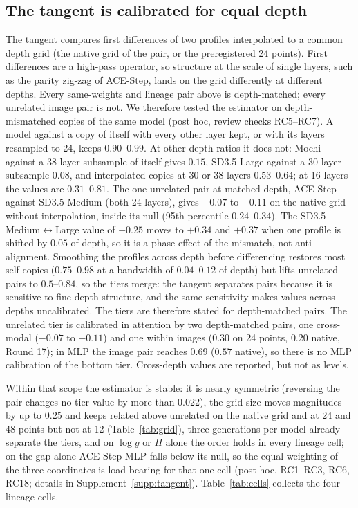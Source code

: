 \documentclass[11pt]{article}
\begin{document}
\FloatBarrier
\subsection{The tangent is calibrated for equal depth}\label{sec:depthcal}
The tangent compares first differences of two profiles interpolated to a common depth grid (the native grid of the pair, or the preregistered 24 points). First differences are a high-pass operator, so structure at the scale of single layers, such as the parity zig-zag of ACE-Step, lands on the grid differently at different depths. Every same-weights and lineage pair above is depth-matched; every unrelated image pair is not. We therefore tested the estimator on depth-mismatched copies of the same model (post hoc, review checks RC5--RC7). A model against a copy of itself with every other layer kept, or with its layers resampled to 24, keeps $0.90$--$0.99$. At other depth ratios it does not: Mochi against a 38-layer subsample of itself gives $0.15$, SD3.5 Large against a 30-layer subsample $0.08$, and interpolated copies at 30 or 38 layers $0.53$--$0.64$; at 16 layers the values are $0.31$--$0.81$. The one unrelated pair at matched depth, ACE-Step against SD3.5 Medium (both 24 layers), gives $-0.07$ to $-0.11$ on the native grid without interpolation, inside its null (95th percentile $0.24$--$0.34$). The SD3.5 Medium$\leftrightarrow$Large value of $-0.25$ moves to $+0.34$ and $+0.37$ when one profile is shifted by $0.05$ of depth, so it is a phase effect of the mismatch, not anti-alignment. Smoothing the profiles across depth before differencing restores most self-copies ($0.75$--$0.98$ at a bandwidth of $0.04$--$0.12$ of depth) but lifts unrelated pairs to $0.5$--$0.84$, so the tiers merge: the tangent separates pairs because it is sensitive to fine depth structure, and the same sensitivity makes values across depths uncalibrated. The tiers are therefore stated for depth-matched pairs. The unrelated tier is calibrated in attention by two depth-matched pairs, one cross-modal ($-0.07$ to $-0.11$) and one within images ($0.30$ on 24 points, $0.20$ native, Round 17); in MLP the image pair reaches $0.69$ ($0.57$ native), so there is no MLP calibration of the bottom tier. Cross-depth values are reported, but not as levels.

Within that scope the estimator is stable: it is nearly symmetric (reversing the pair changes no tier value by more than $0.022$), the grid size moves magnitudes by up to $0.25$ and keeps related above unrelated on the native grid and at 24 and 48 points but not at 12 (Table~\ref{tab:grid}), three generations per model already separate the tiers, and on $\log g$ or $H$ alone the order holds in every lineage cell; on the gap alone ACE-Step MLP falls below its null, so the equal weighting of the three coordinates is load-bearing for that one cell (post hoc, RC1--RC3, RC6, RC18; details in Supplement~\ref{supp:tangent}). Table~\ref{tab:cells} collects the four lineage cells.
\end{document}
